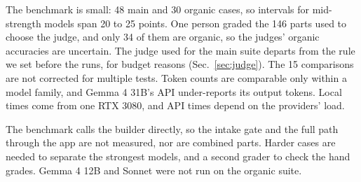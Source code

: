 The benchmark is small: 48 main and 30 organic cases, so intervals for mid-strength models span 20 to 25 points.
One person graded the 146 parts used to choose the judge, and only 34 of them are organic, so the judges' organic accuracies are uncertain.
The judge used for the main suite departs from the rule we set before the runs, for budget reasons (Sec.~\ref{sec:judge}).
The 15 comparisons are not corrected for multiple tests.
Token counts are comparable only within a model family, and Gemma 4 31B's API under-reports its output tokens.
Local times come from one RTX 3080, and API times depend on the providers' load.

The benchmark calls the builder directly, so the intake gate and the full path through the app are not measured, nor are combined parts.
Harder cases are needed to separate the strongest models, and a second grader to check the hand grades.
Gemma 4 12B and Sonnet were not run on the organic suite.
